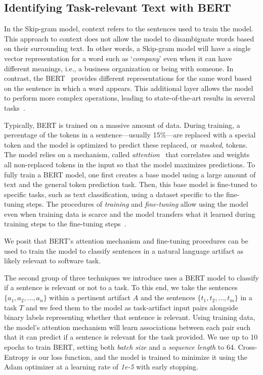 \subsection{Identifying Task-relevant Text with BERT}
\label{cp5:approach-bert}


In the Skip-gram model, context refers to the sentences used to train the model. This approach to context  does not allow the model to disambiguate words based on their surrounding text. In other words, a Skip-gram model will have a single vector representation for a word such as `\textit{company}' even when it can have different meanings, i.e., a business organization or being with someone. In contrast, 
the \acf{BERT}~\cite{Devlin2018Bert} provides different representations for the same word based on the sentence in which a word appears.
This additional layer allows the model to perform more complex operations,
leading to state-of-the-art results in several tasks~\cite{Devlin2018Bert}. 





Typically, BERT is trained 
on a massive amount of data. During training, a percentage of the tokens in a sentence---usually 15\%---are replaced with a special token and the model is optimized to predict these replaced, or \textit{masked}, tokens. 
The model relies on a mechanism, called \textit{attention}~\cite{Vaswani2017attention} that correlates and weights all non-replaced tokens in the input so that the model maximizes predictions.
To fully train a BERT model, one first creates a base model using a large amount of text and the general token prediction task. 
Then, this base model is fine-tuned to specific tasks, such as text classification, using a dataset specific to the fine-tuning steps. The procedures of \textit{training} and \textit{fine-tuning}
allow using the model even when training data is scarce and the model transfers
what it learned during training steps to the fine-tuning steps~\cite{Devlin2018Bert}.


We posit that BERT's attention mechanism and fine-tuning procedures can be used to train the model to classify 
sentences in a natural language artifact as likely relevant to software task. 

The second group of three techniques we introduce uses a BERT model to classify if a sentence is relevant or not to a task.
To this end, we take the sentences $\{a_1, a_2, \dots, a_n\}$ within a pertinent artifact $A$ and the sentences $\{t_1, t_2, \dots, t_m\}$ in a task $T$ and we feed them to the model as task-artifact input pairs 
alongside binary labels representing whether that sentence is relevant. 
Using training data, the model's attention mechanism will learn associations between each pair such that it can predict if a sentence is relevant for the task provided. We use up to 10 epochs to train BERT, setting both \textit{batch size} and a \textit{sequence length} to 64. Cross-Entropy is our loss function, and the model is trained to minimize it using the Adam optimizer at a learning rate of \textit{1e-5} with early stopping. 




